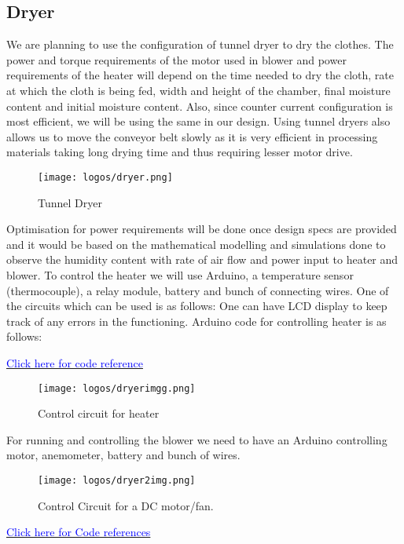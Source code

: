 \documentclass[table]{rapportCS}
\begin{document}
\subsection{Dryer}
We are planning to use the configuration of tunnel dryer to dry the clothes. The power and torque requirements of the motor used in blower and power requirements of the heater will depend on the time needed to dry the cloth, rate at which the cloth is being fed, width and height of the chamber, final moisture content and initial moisture content.
Also, since counter current configuration is most efficient, we will be using the same in our design. Using tunnel dryers also allows us to move the conveyor belt slowly as it is very efficient in processing materials taking long drying time and thus requiring lesser motor drive.
\begin{figure}[h]
    \centering
    \texttt{[image: logos/dryer.png]}
    \caption{Tunnel Dryer}
    \label{fig:outlinemindmap}
\end{figure}
Optimisation for power requirements will be done once design specs are provided and it would be based on the mathematical modelling and simulations done to observe the humidity content with rate of air flow and power input to heater and blower.
To control the heater we will use Arduino, a temperature sensor (thermocouple), a relay module, battery and bunch of connecting wires.
One of the circuits which can be used is as follows:
One can have LCD display to keep track of any errors in the functioning.
Arduino code for controlling heater is as follows:

\href{https://github.com/naunidhsingh03/ELP305-TribeD-Resources/blob/5ba1988fe283faba21ba7098978bb225e509d5cb/Codes/dryer.ino}{\textcolor{blue}{Click here for code reference}}
\clearpage
\begin{figure}[h]
    \centering
    \texttt{[image: logos/dryerimgg.png]}
    \caption{Control circuit for heater
}
    \label{fig:outlinemindmap}
\end{figure}
For running and controlling the blower we need to have an Arduino controlling motor, anemometer, battery and bunch of wires.

\begin{figure}[h]
    \centering
    \texttt{[image: logos/dryer2img.png]}
    \caption{Control Circuit for a DC motor/fan.}
    \label{fig:outlinemindmap}
\end{figure}
\hspace{1cm}\href{https://github.com/naunidhsingh03/ELP305-TribeD-Resources/blob/b90ebc4b82fa8bee4717be5c5bfab0fe1fc3e671/Codes/dryer_code_2.ino}{\textcolor{blue}{Click here for Code references}}
\end{document}

